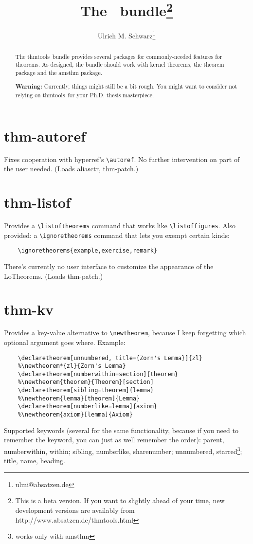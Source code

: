 \documentclass[a4paper, abstracton]{scrartcl}
\title{The \thmtools\ bundle\thanks{%
  This is a beta version. If you want to slightly ahead of your time,
  new development versions are availably from http://www.absatzen.de/thmtools.html
}}
\author{Ulrich M. Schwarz\thanks{ulmi@absatzen.de}}
\newcommand\thmtools{\textsf{thmtools}}
\begin{document}
  \maketitle
  
  \begin{abstract}
    The \thmtools\ bundle provides several packages for commonly-needed 
    features for theorems. As designed, the bundle should work with kernel
    theorems, the theorem package and the amsthm package.
    
    \textbf{Warning:} Currently, things might still be a bit rough. You
    might want to consider not relying on \thmtools\ for your Ph.D. thesis
    masterpiece.
  \end{abstract}
  
  
  \section{thm-autoref}
  
  Fixes cooperation with hyperref's \verb|\autoref|. No further intervention
  on part of the user needed. (Loads aliasctr, thm-patch.)
  
  \section{thm-listof}
  
  Provides a \verb|\listoftheorems| command that works like
  \verb|\listoffigures|. Also provided: a \verb|\ignoretheorems| command that
  lets you exempt certain kinds:
  \begin{verbatim}
    \ignoretheorems{example,exercise,remark}
  \end{verbatim}
  There's currently no user interface to customize the appearance of the
  LoTheorems. (Loads thm-patch.)
  
  \section{thm-kv}
  
  Provides a key-value alternative to \verb|\newtheorem|, because I keep
  forgetting which optional argument goes where. Example:
  \begin{verbatim}
    \declaretheorem[unnumbered, title={Zorn's Lemma}]{zl}
    %\newtheorem*{zl}{Zorn's Lemma}
    \declaretheorem[numberwithin=section]{theorem}
    %\newtheorem{theorem}{Theorem}[section]
    \declaretheorem[sibling=theorem]{lemma}
    %\newtheorem{lemma}[theorem]{Lemma}
    \declaretheorem[numberlike=lemma]{axiom}
    %\newtheorem{axiom}[lemma]{Axiom}
  \end{verbatim}
  Supported keywords (several for the same functionality, because if you
  need to remember the keyword, you can just as well remember the order): 
  parent, numberwithin, within; sibling, numberlike, sharenumber;
  unnumbered, starred\footnote{works only with amsthm}; title, name,
  heading.
  
\end{document}
